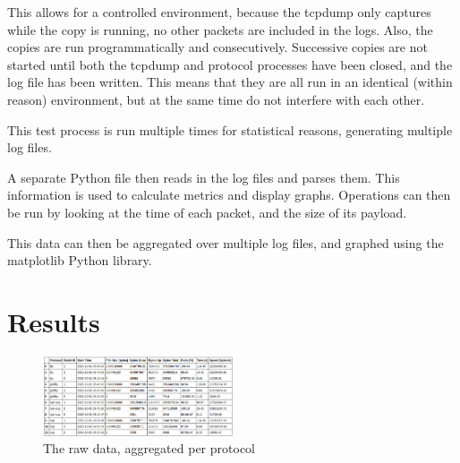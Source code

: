 \documentclass{sig-alternate-05-2015}
\begin{document}
This allows for a controlled environment, because the tcpdump only captures while the copy is running, no other packets are included in the logs. Also, the copies are run programmatically and consecutively. Successive copies are not started until both the tcpdump and protocol processes have been closed, and the log file has been written. This means that they are all run in an identical (within reason) environment, but at the same time do not interfere with each other.

This test process is run multiple times for statistical reasons, generating multiple log files.

A separate Python file then reads in the log files and parses them. This information is used to calculate metrics and display graphs.
Operations can then be run by looking at the time of each packet, and the size of its payload. 

This data can then be aggregated over multiple log files, and graphed using the matplotlib Python library.

\newpage
\newpage
\section{Results}
\begin{figure}
	\centering
	\includegraphics[width=0.5\textwidth]{img/dataframe.png}
	\caption{The raw data, aggregated per protocol
	         \label{fig:testdata_detail}}
\end{figure}
\end{document}

